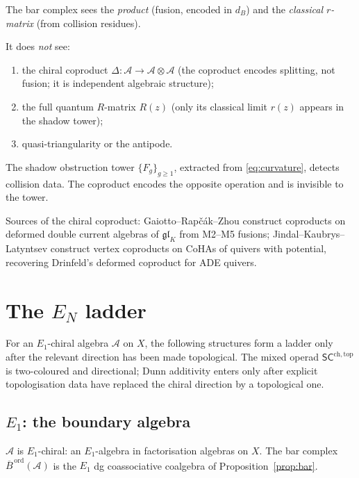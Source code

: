 \documentclass[11pt]{article}
\theoremstyle{remark}
\providecommand{\cA}{\mathcal{A}}
\providecommand{\fgl}{\mathfrak{gl}}
\providecommand{\SCchtop}{\mathsf{SC}^{\mathrm{ch},\mathrm{top}}}
\providecommand{\Bord}{\overline{B}^{\,\mathrm{ord}}}
\begin{document}
The bar complex sees the \emph{product} (fusion, encoded in $d_B$)
and the \emph{classical $r$-matrix} (from collision residues).

It does \emph{not} see:
\begin{enumerate}[label=(\roman*)]
\item the chiral coproduct $\Delta \colon \cA \to \cA \otimes \cA$
  (the coproduct encodes splitting, not fusion; it is independent
  algebraic structure);
\item the full quantum $R$-matrix $R(z)$ (only its classical limit
  $r(z)$ appears in the shadow tower);
\item quasi-triangularity or the antipode.
\end{enumerate}

The shadow obstruction tower $\{F_g\}_{g \ge 1}$, extracted from
\eqref{eq:curvature}, detects collision data.  The coproduct encodes
the opposite operation and is invisible to the tower.

Sources of the chiral coproduct: Gaiotto--Rap\v{c}\'ak--Zhou
\cite{GRZ} construct coproducts on deformed double current algebras
of $\fgl_K$ from M2--M5 fusions;
Jindal--Kaubrys--Latyntsev \cite{JKL} construct vertex coproducts
on CoHAs of quivers with potential, recovering Drinfeld's deformed
coproduct for ADE quivers.


\section{The $E_N$ ladder}
\label{sec:ladder}

For an $E_1$-chiral algebra $\cA$ on $X$, the following structures form
a ladder only after the relevant direction has been made topological.
The mixed operad $\SCchtop$ is two-coloured and directional; Dunn
additivity enters only after explicit topologisation data have replaced
the chiral direction by a topological one.

\subsection*{$E_1$: the boundary algebra}

$\cA$ is $E_1$-chiral: an $E_1$-algebra in factorisation algebras
on $X$.  The bar complex $\Bord(\cA)$ is the $E_1$ dg coassociative
coalgebra of Proposition~\ref{prop:bar}.
\end{document}

